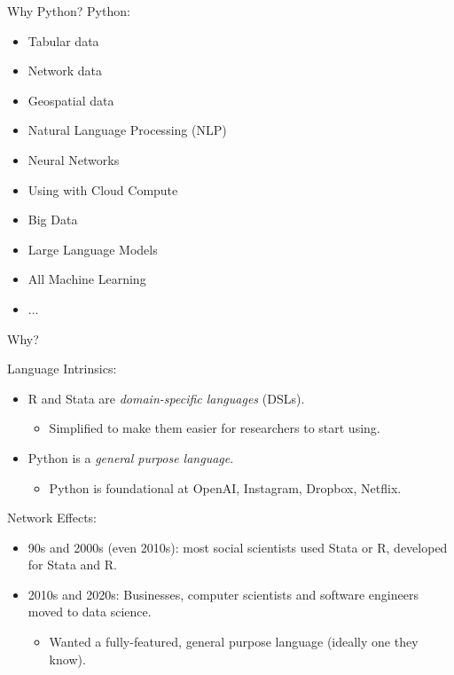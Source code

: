 \documentclass[11pt]{beamer}
\begin{document}
\begin{frame}{Why Python?}
Python:
\begin{itemize}
	\item Tabular data
	\item Network data
	\item Geospatial data
	\item Natural Language Processing (NLP)
	\item Neural Networks
	\item Using with Cloud Compute
	\item Big Data
	\item Large Language Models
	\item All Machine Learning
	\item ...
\end{itemize}
\end{frame}

\begin{frame}[c]{Why?}

Language Intrinsics:
\begin{itemize}
	\pause \item R and Stata are \emph{domain-specific languages} (DSLs).
	\begin{itemize}
		\pause \item Simplified to make them easier for researchers to start using.
	\end{itemize}
	\pause \item Python is a \emph{general purpose language}.
	\begin{itemize}
		\pause \item Python is foundational at OpenAI, Instagram, Dropbox, Netflix.
	\end{itemize}
\end{itemize}

\pause Network Effects:
\begin{itemize}
	\pause \item 90s and 2000s (even 2010s): most social scientists used Stata or R, developed for Stata and R.
	\pause \item 2010s and 2020s: Businesses, computer scientists and software engineers moved to data science.
	\begin{itemize}
		\item Wanted a fully-featured, general purpose language (ideally one they know).
	\end{itemize}
\end{itemize}
\end{frame}
\end{document}
